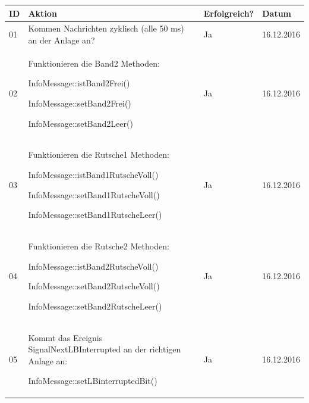 \documentclass[a4paper, 11pt]{article}
\begin{document}
\begin{table}[H]
\center
    \begin{tabularx}{\textwidth}{|l|X|l|l|}
        \hline
        \textbf{ID}&\textbf{Aktion}&\textbf{Erfolgreich?}&\textbf{Datum}\\
        \hline
        01&Kommen Nachrichten zyklisch (alle 50 ms) an der Anlage an?
        &Ja&16.12.2016\\
        \hline
        
        02&Funktionieren die Band2 Methoden:
        \begin{compactenum}[]
            \item \ttfamily InfoMessage::istBand2Frei()
            \item \ttfamily InfoMessage::setBand2Frei()
            \item \ttfamily InfoMessage::setBand2Leer()
        \end{compactenum}
        &Ja&16.12.2016\\
        \hline
        
        03&Funktionieren die Rutsche1 Methoden:
        \begin{compactenum}[] 
            \item \ttfamily InfoMessage::istBand1RutscheVoll()
            \item \ttfamily InfoMessage::setBand1RutscheVoll()
            \item \ttfamily InfoMessage::setBand1RutscheLeer()
        \end{compactenum}
        &Ja&16.12.2016\\
        \hline

        04&Funktionieren die Rutsche2 Methoden:
        \begin{compactenum}[]
            \item \ttfamily InfoMessage::istBand2RutscheVoll()
            \item \ttfamily InfoMessage::setBand2RutscheVoll()
            \item \ttfamily InfoMessage::setBand2RutscheLeer()
        \end{compactenum}
        &Ja&16.12.2016\\
        \hline
        
        05&Kommt das Ereignis SignalNextLBInterrupted an der richtigen Anlage an: 
        \begin{compactenum}[]
            \item \ttfamily InfoMessage::setLBinterruptedBit()
        \end{compactenum}
        &Ja&16.12.2016\\
        \hline
        

\end{tabularx}
\end{table}
\end{document}
